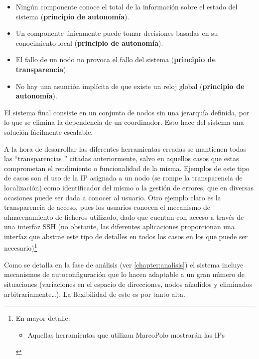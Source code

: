 \begin{itemize}
  \item Ningún componente conoce el total de la información sobre el estado del sistema (\textbf{principio de autonomía}).
  \item Un componente únicamente puede tomar decisiones basadas en su conocimiento local (\textbf{principio de autonomía}).
  \item El fallo de un nodo no provoca el fallo del sistema (\textbf{principio de transparencia}).
  \item No hay una asunción implícita de que existe un reloj global (\textbf{principio de autonomía}).
\end{itemize}


El sistema final consiste en un conjunto de nodos sin una jerarquía definida, por lo que se elimina la dependencia de un coordinador. Esto hace del sistema una solución fácilmente escalable.

A la hora de desarrollar las diferentes herramientas creadas se mantienen todas las  ``transparencias '' citadas anteriormente, salvo en aquellos casos que estas comprometan el rendimiento o funcionalidad de la misma. Ejemplos de este tipo de casos son el uso de la IP asignada a un nodo (se rompe la transparencia de localización) como identificador del mismo o la gestión de errores, que en diversas ocasiones puede ser dada a conocer al usuario. Otro ejemplo claro es la transparencia de acceso, pues los usuarios conocen el mecanismo de almacenamiento de ficheros utilizado, dado que cuentan con acceso a través de una interfaz SSH (no obstante, las diferentes aplicaciones proporcionan una interfaz que abstrae este tipo de detalles en todos los casos en los que puede ser necesario)\footnote{
  En mayor detalle:
  \begin{itemize}
  \item Aquellas herramientas que utilizan MarcoPolo mostrarán las IPs
  \end{itemize}
\citationneeded
}

Como se detalla en la fase de análisis (ver \ref{chapter:analisis}) el sistema incluye mecanismos de autoconfiguración que lo hacen adaptable a un gran número de situaciones (variaciones en el espacio de direcciones, nodos añadidos y eliminados arbitrariamente\dots). La flexibilidad de este es por tanto alta.

